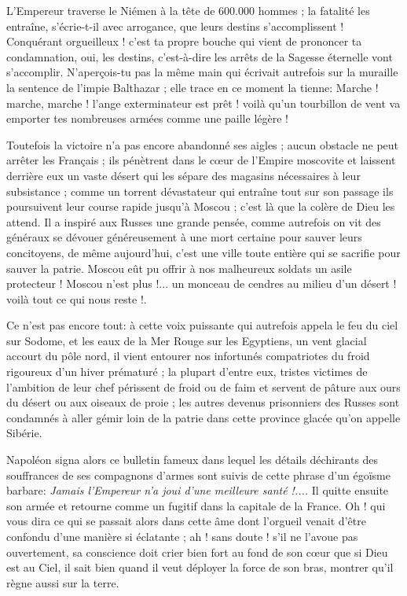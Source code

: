 \documentclass[11pt,a4paper]{report}
\begin{document}
L'Empereur traverse le Niémen à la tête de 600.000 hommes ; la fatalité les entraîne, s'écrie-t-il avec arrogance, que leurs destins s'accomplissent ! Conquérant orgueilleux ! c'est ta propre bouche qui vient de prononcer ta condamnation, oui, les destins, c'est-à-dire les arrêts de la Sagesse éternelle vont s'accomplir. N'aperçois-tu pas la même main qui écrivait autrefois sur la muraille la sentence de l'impie Balthazar ; elle trace en ce moment la tienne: Marche ! marche, marche ! l'ange exterminateur est prêt ! voilà qu'un tourbillon de vent va emporter tes nombreuses armées comme une paille légère !

Toutefois la victoire n'a pas encore abandonné ses aigles ; aucun obstacle ne peut arrêter les Français ; ils pénètrent dans le cœur de l'Empire moscovite et laissent derrière eux un vaste désert qui les sépare des magasins nécessaires à leur subsistance ; comme un torrent dévastateur qui entraîne tout sur son passage ils poursuivent leur course rapide jusqu'à Moscou ; c'est là que la colère de Dieu les attend. Il a inspiré aux Russes une grande pensée, comme autrefois on vit des généraux se dévouer généreusement à une mort certaine pour sauver leurs concitoyens, de même aujourd'hui, c'est une ville toute entière qui se sacrifie pour sauver la patrie. Moscou eût pu offrir à nos malheureux soldats un asile protecteur ! Moscou n'est plus !... un monceau de cendres au milieu d'un désert ! voilà tout ce qui nous reste !.

Ce n'est pas encore tout: à cette voix puissante qui autrefois appela le feu du ciel sur Sodome, et les eaux de la Mer Rouge sur les Egyptiens, un vent glacial accourt du pôle nord, il vient entourer nos infortunés compatriotes du froid rigoureux d'un hiver prématuré ; la plupart d'entre eux, tristes victimes de l'ambition de leur chef périssent de froid ou de faim et servent de pâture aux ours du désert ou aux oiseaux de proie ; les autres devenus prisonniers des Russes sont condamnés à aller gémir loin de la patrie dans cette province glacée qu'on appelle Sibérie.

Napoléon signa alors ce bulletin fameux dans lequel les détails déchirants des souffrances de ses compagnons d'armes sont suivis de cette phrase d'un égoïsme barbare: \textit{Jamais l'Empereur n'a joui d'une meilleure santé !....} Il quitte ensuite son armée et retourne comme un fugitif dans la capitale de la France. Oh ! qui vous dira ce qui se passait alors dans cette âme dont l'orgueil venait d'être confondu d'une manière si éclatante ; ah ! sans doute ! s'il ne l'avoue pas ouvertement, sa conscience doit crier bien fort au fond de son cœur que si Dieu est au Ciel, il sait bien quand il veut déployer la force de son bras, montrer qu'il règne aussi sur la terre.
\end{document}
